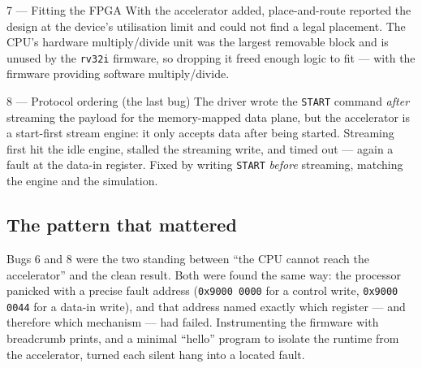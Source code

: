 \documentclass[11pt,a4paper]{article}
\newcommand{\code}[1]{\texttt{\small #1}}
\begin{document}
\begin{bugbox}{7 --- Fitting the FPGA}
With the accelerator added, place-and-route reported the design at the device's
utilisation limit and could not find a legal placement. The CPU's hardware
multiply/divide unit was the largest removable block and is unused by the
\code{rv32i} firmware, so dropping it freed enough logic to fit --- with the
firmware providing software multiply/divide.
\end{bugbox}

\begin{bugbox}{8 --- Protocol ordering (the last bug)}
The driver wrote the \code{START} command \emph{after} streaming the payload for
the memory-mapped data plane, but the accelerator is a start-first stream engine:
it only accepts data after being started. Streaming first hit the idle engine,
stalled the streaming write, and timed out --- again a fault at the data-in
register. Fixed by writing \code{START} \emph{before} streaming, matching the
engine and the simulation.
\end{bugbox}

\subsection{The pattern that mattered}
Bugs 6 and 8 were the two standing between ``the CPU cannot reach the
accelerator'' and the clean result. Both were found the same way: the processor
panicked with a precise fault address (\code{0x9000\,0000} for a control write,
\code{0x9000\,0044} for a data-in write), and that address named exactly which
register --- and therefore which mechanism --- had failed. Instrumenting the
firmware with breadcrumb prints, and a minimal ``hello'' program to isolate the
runtime from the accelerator, turned each silent hang into a located fault.

\end{document}
